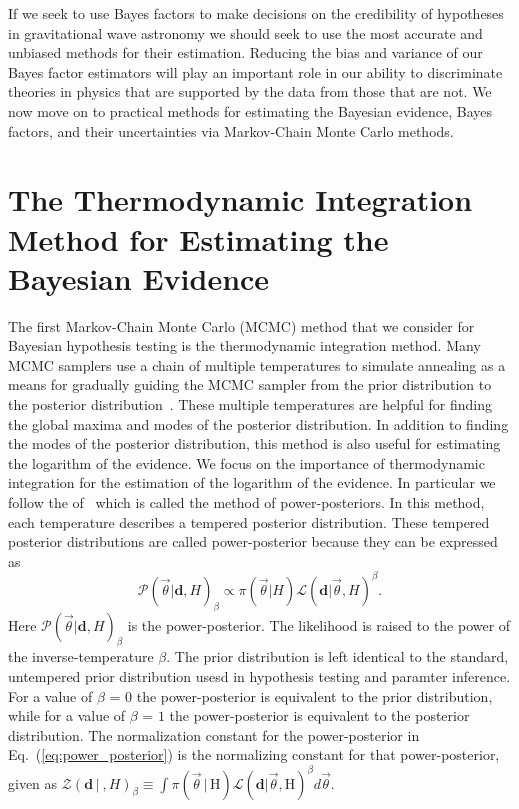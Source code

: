 If we seek to use Bayes factors to make decisions on the credibility of hypotheses in gravitational wave astronomy we should seek to use the most accurate and unbiased methods for their estimation. Reducing the bias and variance of our Bayes factor estimators will play an important role in our ability to discriminate theories in physics that are supported by the data from those that are not. We now move on to practical methods for estimating the Bayesian evidence, Bayes factors, and their uncertainties via Markov-Chain Monte Carlo methods.

\section{The Thermodynamic Integration Method for Estimating the Bayesian Evidence}\label{sec:ti}
The first Markov-Chain Monte Carlo (MCMC) method that we consider for Bayesian hypothesis testing is the thermodynamic integration method. Many MCMC samplers use a chain of multiple temperatures to simulate annealing as a means for gradually guiding the MCMC sampler from the prior distribution to the posterior distribution~\citep{emcee, vousden:2016, doi:10.1143/PTPS.157.317, B509983H}. These multiple temperatures are helpful for finding the global maxima and modes of the posterior distribution. In addition to finding the modes of the posterior distribution, this method is also useful for estimating the logarithm of the evidence. We focus on the importance of thermodynamic integration for the estimation of the logarithm of the evidence. In particular we follow the of~\cite{lartillot2006computing, friel2008marginal} which is called the method of power-posteriors. In this method, each temperature describes a tempered posterior distribution. These tempered posterior distributions are called power-posterior because they can be expressed as
\begin{equation}
    \mathcal{P}\left(\vec{\theta}|\mathbf{d}, H\right)_\beta \propto \pi\left(\vec{\theta} | H\right) \mathcal{L}\left(\mathbf{d} | \vec{\theta}, H\right)^\beta.
\end{equation}\label{eq:power_posterior}
Here $\mathcal{P}\left(\vec{\theta}|\mathbf{d}, H\right)_\beta$ is the power-posterior. The likelihood is raised to the power of the inverse-temperature $\beta$. The prior distribution is left identical to the standard, untempered prior distribution usesd in hypothesis testing and paramter inference. For a value of $\beta$ = $0$ the power-posterior is equivalent to the prior distribution, while for a value of $\beta$ = $1$ the power-posterior is equivalent to the posterior distribution. The normalization constant for the power-posterior in Eq.~(\ref{eq:power_posterior}) is the normalizing constant for that power-posterior, given as $\mathcal{Z}(\mathbf{d} \, | \ ,H)_\beta \equiv \int \pi\left(\vec{\theta} \, | \, \mathrm{H}\right) \mathcal{L}\left(\mathbf{d} | \vec{\theta}, \mathrm{H}\right)^\beta d\vec{\theta}$.

